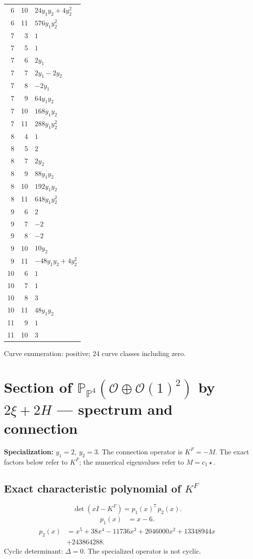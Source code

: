 \documentclass[10pt,a4paper]{article}
\begin{document}
{\begin{longtable}{rrp{125mm}}
6 & 10 & $24 y_{1} y_{2} + 4 y_{2}^{2}$\\
6 & 11 & $576 y_{1} y_{2}^{2}$\\
7 & 3 & $1$\\
7 & 5 & $1$\\
7 & 6 & $2 y_{1}$\\
7 & 7 & $2 y_{1} - 2 y_{2}$\\
7 & 8 & $- 2 y_{1}$\\
7 & 9 & $64 y_{1} y_{2}$\\
7 & 10 & $168 y_{1} y_{2}$\\
7 & 11 & $288 y_{1} y_{2}^{2}$\\
8 & 4 & $1$\\
8 & 5 & $2$\\
8 & 7 & $2 y_{2}$\\
8 & 9 & $88 y_{1} y_{2}$\\
8 & 10 & $192 y_{1} y_{2}$\\
8 & 11 & $648 y_{1} y_{2}^{2}$\\
9 & 6 & $2$\\
9 & 7 & $-2$\\
9 & 8 & $-2$\\
9 & 10 & $10 y_{2}$\\
9 & 11 & $- 48 y_{1} y_{2} + 4 y_{2}^{2}$\\
10 & 6 & $1$\\
10 & 7 & $1$\\
10 & 8 & $3$\\
10 & 11 & $48 y_{1} y_{2}$\\
11 & 9 & $1$\\
11 & 10 & $3$\\
\end{longtable}}
Curve enumeration: positive; 24 curve classes including zero.
\clearpage\section*{Section of $\mathbb P_{\mathbb P^{4}}(\mathcal O\oplus \mathcal O(1)^{2})$ by $2\xi +2H$ --- spectrum and connection}
\textbf{Specialization:} $y_1=2,\ y_2=3$. The connection operator is $K^F=-M$. The exact factors below refer to $K^F$; the numerical eigenvalues refer to $M=c_1\star$.
\subsection*{Exact characteristic polynomial of $K^F$}
\[\det(xI-K^F)=p_{1}(x)^{7}\,p_{2}(x).\]
\[\begin{aligned}p_{1}(x)&=x - 6.\end{aligned}\]
\[\begin{aligned}p_{2}(x)&=x^{5} + 38 x^{4} - 11736 x^{3} + 2046000 x^{2} + 13348944 x\\&+243864288.\end{aligned}\]
Cyclic determinant: $\Delta=0$. The specialized operator is not cyclic.
\end{document}

